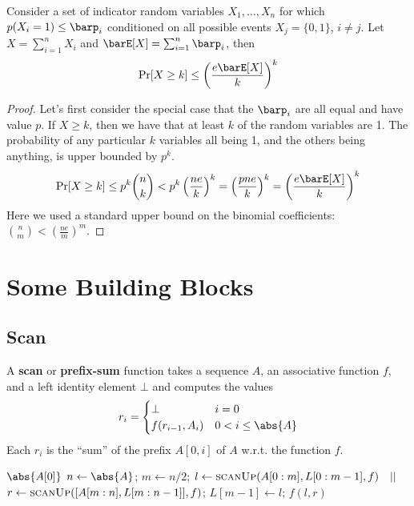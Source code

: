 \documentclass[11pt]{article}
\begin{document}
\begin{theorem}[]
Consider a set of indicator random variables \(X_1,\dots,X_n\) for which \(p(X_i=1)\le\barp_i\) conditioned on
all possible events \(X_j=\{0,1\}\), \(i\neq j\). Let \(X=\sum_{i=1}^nX_i\) and \(\barE[X]=\sum_{i=1}^n\barp_i\),
then
\begin{equation*}
\Pr[X\ge k]\le\left( \frac{e\barE[X]}{k} \right)^k
\end{equation*}
\end{theorem}

\begin{proof}
Let's first consider the special case that the \(\barp_i\) are all equal and have value \(p\). If
\(X\ge k\), then we have that at least \(k\) of the random variables are 1. The probability of any
particular \(k\) variables all being 1, and the others being anything, is upper bounded by \(p^k\).
\begin{equation*}
\Pr[X\ge k]\le p^k\binom{n}{k}<p^k\left(\frac{ne}{k}\right)^k
=\left(\frac{pne}{k}\right)^k=
\left(\frac{e\barE[X]}{k}\right)^k
\end{equation*}
Here we used a standard upper bound on the binomial coefficients: \(\binom{n}{m}<\left(\frac{ne}{m}\right)^m\).
\end{proof}
\section{Some Building Blocks}
\label{sec:org677eba5}
\subsection{Scan}
\label{sec:org542bc3b}
A \textbf{scan} or \textbf{prefix-sum} function takes a sequence \(A\), an associative function \(f\), and a left
identity element \(\bot\) and computes the values
\begin{equation*}
r_i=
\begin{cases}
\bot&i=0\\
f(r_{i-1},A_i)&0<i\le\abs{A}
\end{cases}
\end{equation*}
Each \(r_i\) is the ``sum'' of the prefix \(A[0,i]\) of \(A\) w.r.t. the function \(f\).

\begin{algorithmic}
        \Return \(\abs{A[0]}\)
\Else
        \State \(n\gets\abs{A}\);
        \State \(m\gets n/2\);
        \State \(l\gets\textsc{scanUp}(A[0:m],L[0:m-1],f)\quad||\)
        \State \(r\gets\textsc{scanUp}([A[m:n],L[m:n-1]],f)\);
        \State \(L[m-1]\gets l\);
        \State \Return \(f(l,r)\)
\EndIf
\EndFunction
\end{algorithmic}
\end{document}
